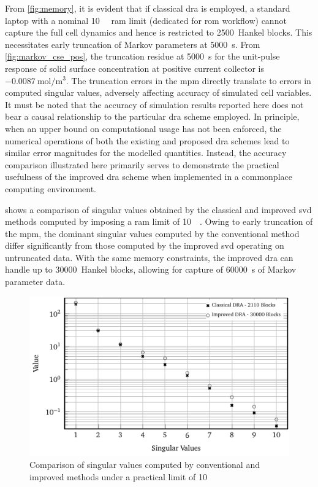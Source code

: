 From  \cref{fig:memory},   it  is  evident   that  if  classical   \gls{dra}  is
employed,  a  standard  laptop  with  a  nominal  \SI{10}{\giga\byte}  \gls{ram}
limit   (dedicated   for   \gls{rom}   workflow)   cannot   capture   the   full
cell   dynamics  and   hence   is  restricted   to   2500~Hankel  blocks.   This
necessitates early  truncation of Markov parameters  at \SI{5000}{\second}. From
\cref{fig:markov_cse_pos}, the truncation residue  at \SI{5000}{\second} for the
unit-pulse response of solid surface concentration at positive current collector
is $\SI{-0.0087}{\mole\per\meter\cubed}$. The truncation errors in the \gls{mpm}
directly translate  to errors in  computed singular values,  adversely affecting
accuracy of  simulated cell  variables. It  must be noted  that the  accuracy of
simulation results  reported here  does not  bear a  causal relationship  to the
particular  \gls{dra} scheme  employed. In  principle,  when an  upper bound  on
computational usage has not been enforced,  the numerical operations of both the
existing and proposed \gls{dra} schemes lead to similar error magnitudes for the
modelled quantities. Instead, the accuracy comparison illustrated here primarily
serves to demonstrate the practical  usefulness of the improved \gls{dra} scheme
when implemented in a commonplace computing environment.

  shows a  comparison  of singular  values  obtained by  the
classical and improved \gls{svd} methods  computed by imposing a \gls{ram} limit
of \SI{10}{\giga\byte}. Owing to early truncation of the \gls{mpm}, the dominant
singular values  computed by the  conventional method differ  significantly from
those computed by the improved \gls{svd} operating on untruncated data. With the
same memory  constraints, the improved  \gls{dra} can handle up  to 30000~Hankel
blocks, allowing for capture of \SI{60000}{\second} of Markov parameter data.

\begin{figure}[!htbp]
    \centering
    \includegraphics{truncated.pdf}
    \caption{Comparison of singular values computed by conventional and improved
         methods under a practical  limit of
    \SI{10}{\giga\byte}}
    \label{fig:truncated}
\end{figure}

